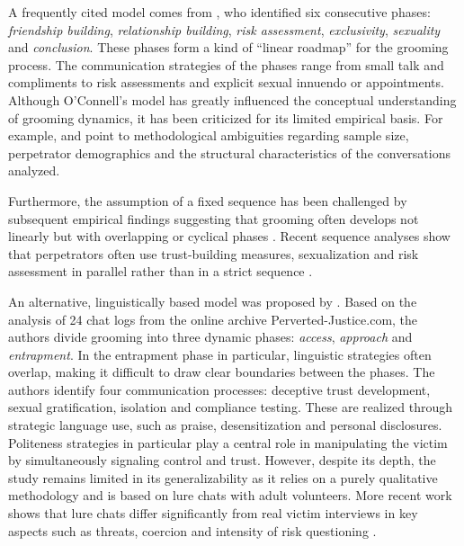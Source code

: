 A frequently cited model comes from \textcite{oconnell2003typology}, who identified six consecutive phases: \emph{friendship building}, \emph{relationship building}, \emph{risk assessment}, \emph{exclusivity}, \emph{sexuality} and \emph{conclusion}. These phases form a kind of “linear roadmap” for the grooming process. The communication strategies of the phases range from small talk and compliments to risk assessments and explicit sexual innuendo or appointments. Although O'Connell's model has greatly influenced the conceptual understanding of grooming dynamics, it has been criticized for its limited empirical basis. For example, \textcite{broome2020psycholinguistic} and \textcite{LorenzoDus2019} point to methodological ambiguities regarding sample size, perpetrator demographics and the structural characteristics of the conversations analyzed. %

Furthermore, the assumption of a fixed sequence has been challenged by subsequent empirical findings suggesting that grooming often develops not linearly but with overlapping or cyclical phases \parencite{Joleby2021offender}. Recent sequence analyses show that perpetrators often use trust-building measures, sexualization and risk assessment in parallel rather than in a strict sequence \parencite{Ringenberg2024assessing}.

An alternative, linguistically based model was proposed by \textcite{lorenzo2016understanding}. Based on the analysis of 24 chat logs from the online archive Perverted-Justice.com, the authors divide grooming into three dynamic phases: \emph{access}, \emph{approach} and \emph{entrapment}. In the entrapment phase in particular, linguistic strategies often overlap, making it difficult to draw clear boundaries between the phases. The authors identify four communication processes: deceptive trust development, sexual gratification, isolation and compliance testing. These are realized through strategic language use, such as praise, desensitization and personal disclosures. Politeness strategies in particular play a central role in manipulating the victim by simultaneously signaling control and trust. However, despite its depth, the study remains limited in its generalizability as it relies on a purely qualitative methodology and is based on lure chats with adult volunteers. More recent work shows that lure chats differ significantly from real victim interviews in key aspects such as threats, coercion and intensity of risk questioning \parencite{Ringenberg2024assessing}.  %

